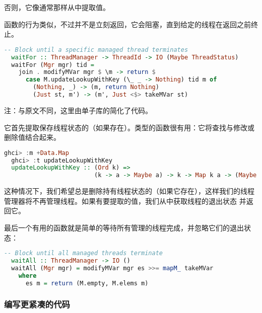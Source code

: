 \documentclass[./main.tex]{subfiles}
\begin{document}
否则，它像通常那样从中提取值。

函数的行为类似，不过并不是立刻返回，它会阻塞，直到给定的线程在返回之前终止。

\begin{lstlisting}[language=Haskell]
  -- Block until a specific managed thread terminates
  waitFor :: ThreadManager -> ThreadId -> IO (Maybe ThreadStatus)
  waitFor (Mgr mgr) tid =
    join . modifyMVar mgr $ \m -> return $
      case M.updateLookupWithKey (\_ _ -> Nothing) tid m of
        (Nothing, _) -> (m, return Nothing)
        (Just st, m') -> (m', Just <$> takeMVar st)
\end{lstlisting}

注：与原文不同，这里由单子库的简化了代码。

它首先提取保存线程状态的（如果存在）。类型的函数很有用：它将查找与修改或删除值结合起来。

\begin{lstlisting}[language=Haskell]
  ghci> :m +Data.Map
  ghci> :t updateLookupWithKey
  updateLookupWithKey :: (Ord k) =>
                         (k -> a -> Maybe a) -> k -> Map k a -> (Maybe a, Map k a)
\end{lstlisting}

这种情况下，我们希望总是删除持有线程状态的（如果它存在），这样我们的线程管理器将不再管理线程。如果有要提取的值，我们从中获取线程的退出状态
并返回它。

最后一个有用的函数就是简单的等待所有管理的线程完成，并忽略它们的退出状态：

\begin{lstlisting}[language=Haskell]
  -- Block until all managed threads terminate
  waitAll :: ThreadManager -> IO ()
  waitAll (Mgr mgr) = modifyMVar mgr es >>= mapM_ takeMVar
    where
      es m = return (M.empty, M.elems m)
\end{lstlisting}

\subsubsection*{编写更紧凑的代码}

%

\begin{lstlisting}[language=Haskell]

\end{lstlisting}



\begin{lstlisting}[language=Haskell]

\end{lstlisting}
\end{document}
